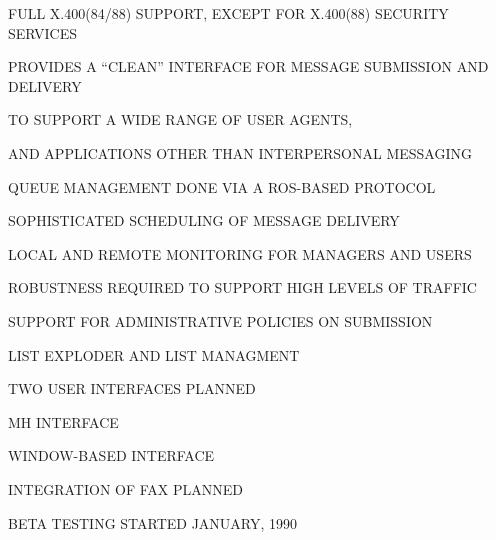 \begin{bwslide}

\begin{nrtc}
\item	FULL X.400(84/88) SUPPORT, EXCEPT FOR X.400(88) SECURITY SERVICES

\item	PROVIDES A ``CLEAN'' INTERFACE FOR MESSAGE SUBMISSION AND DELIVERY
    \begin{nrtc}
    \item	TO SUPPORT A WIDE RANGE OF USER AGENTS,

    \item	AND APPLICATIONS OTHER THAN INTERPERSONAL MESSAGING
    \end{nrtc}

\item	QUEUE MANAGEMENT DONE VIA A ROS-BASED PROTOCOL
    \begin{nrtc}
    \item	SOPHISTICATED SCHEDULING OF MESSAGE DELIVERY

    \item	LOCAL AND REMOTE MONITORING FOR MANAGERS AND USERS

    \item	ROBUSTNESS REQUIRED TO SUPPORT HIGH LEVELS OF TRAFFIC

    \item	SUPPORT FOR ADMINISTRATIVE POLICIES ON SUBMISSION
    \end{nrtc}

\item	LIST EXPLODER AND LIST MANAGMENT    
\end{nrtc}
\end{bwslide}


\begin{bwslide}

\begin{nrtc}
\item	TWO USER INTERFACES PLANNED
    \begin{nrtc}
    \item	MH INTERFACE

    \item	WINDOW-BASED INTERFACE
    \end{nrtc}

\item	INTEGRATION OF FAX PLANNED

\item	BETA TESTING STARTED JANUARY, 1990
\end{nrtc}
\end{bwslide}


